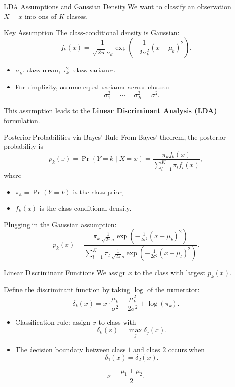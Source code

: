 \documentclass[../../main.tex]{subfiles}
\begin{document}
\begin{frame}{LDA Assumptions and Gaussian Density}
We want to classify an observation $X=x$ into one of $K$ classes.

\begin{block}{Key Assumption}
The class-conditional density is Gaussian:
\[
f_k(x) = \frac{1}{\sqrt{2\pi}\sigma_k} 
\exp\!\left( -\frac{1}{2\sigma_k^2}(x - \mu_k)^2 \right).
\]
\end{block}

\begin{itemize}
    \item $\mu_k$: class mean, $\sigma_k^2$: class variance.
    \item For simplicity, assume equal variance across classes:
    \[
    \sigma_1^2 = \cdots = \sigma_K^2 = \sigma^2.
    \]
\end{itemize}

This assumption leads to the \textbf{Linear Discriminant Analysis (LDA)} formulation.
\end{frame}

\begin{frame}{Posterior Probabilities via Bayes' Rule}
From Bayes’ theorem, the posterior probability is
\[
p_k(x) = \Pr(Y=k \mid X=x) =
\frac{\pi_k f_k(x)}{\sum\limits_{l=1}^K \pi_l f_l(x)},
\]
where
\begin{itemize}
    \item $\pi_k = \Pr(Y=k)$ is the class prior,
    \item $f_k(x)$ is the class-conditional density.
\end{itemize}

Plugging in the Gaussian assumption:
\[
p_k(x) = 
\frac{\pi_k \,\frac{1}{\sqrt{2\pi}\sigma} 
\exp\!\left( -\frac{1}{2\sigma^2}(x - \mu_k)^2 \right)}
{\sum\limits_{l=1}^K \pi_l \,\frac{1}{\sqrt{2\pi}\sigma} 
\exp\!\left( -\frac{1}{2\sigma^2}(x - \mu_l)^2 \right)}.
\]
\end{frame}

\begin{frame}{Linear Discriminant Functions}
We assign $x$ to the class with largest $p_k(x)$.  

Define the discriminant function by taking $\log$ of the numerator:
\[
\delta_k(x) = x \cdot \frac{\mu_k}{\sigma^2} 
- \frac{\mu_k^2}{2\sigma^2} + \log(\pi_k).
\]

\begin{itemize}
    \item Classification rule: assign $x$ to class with
    \[
    \delta_k(x) = \max_{j} \delta_j(x).
    \]
    \item The decision boundary between class $1$ and class $2$ occurs when
    \[
    \delta_1(x) = \delta_2(x).
    \]
\end{itemize}

\[
x = \frac{\mu_1 + \mu_2}{2}.
\]
\end{frame}
\end{document}
